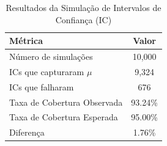 \begin{table}[h]
\centering
\begin{tabular}{|l|c|}
\hline
\textbf{Métrica} & \textbf{Valor} \\
\hline
Número de simulações & 10,000 \\
\hline
ICs que capturaram $\mu$ & 9,324 \\
\hline
ICs que falharam & 676 \\
\hline
Taxa de Cobertura Observada & 93.24\% \\
\hline
Taxa de Cobertura Esperada & 95.00\% \\
\hline
Diferença & 1.76\% \\
\hline
\end{tabular}
\caption{Resultados da Simulação de Intervalos de Confiança (IC)}
\label{tab:validacao_ic}
\end{table}